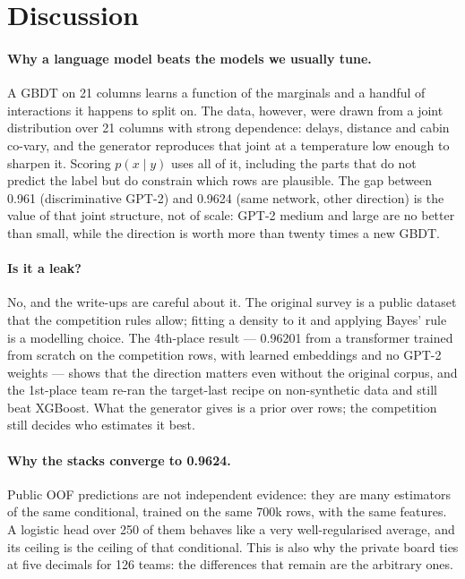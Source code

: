 \section{Discussion}
\label{sec:discussion}

\paragraph{Why a language model beats the models we usually tune.}
A GBDT on 21 columns learns a function of the marginals and a handful of interactions it
happens to split on. The data, however, were drawn from a joint distribution over 21
columns with strong dependence: delays, distance and cabin co-vary, and the generator
reproduces that joint at a temperature low enough to sharpen it. Scoring $p(x\mid y)$ uses
all of it, including the parts that do not predict the label but do constrain which rows
are plausible. The gap between 0.961 (discriminative GPT-2) and 0.9624 (same network, other
direction) is the value of that joint structure, not of scale: GPT-2 medium and large are
no better than small, while the direction is worth more than twenty times a new GBDT.

\paragraph{Is it a leak?}
No, and the write-ups are careful about it. The original survey is a public dataset that
the competition rules allow; fitting a density to it and applying Bayes' rule is a modelling
choice. The 4th-place result --- 0.96201 from a transformer trained from scratch on the
competition rows, with learned embeddings and no GPT-2 weights --- shows that the direction
matters even without the original corpus, and the 1st-place team re-ran the target-last
recipe on non-synthetic data and still beat XGBoost. What the generator gives is a prior
over rows; the competition still decides who estimates it best.

\paragraph{Why the stacks converge to 0.9624.}
Public OOF predictions are not independent evidence: they are many estimators of the same
conditional, trained on the same 700k rows, with the same features. A logistic head over
250 of them behaves like a very well-regularised average, and its ceiling is the ceiling of
that conditional. This is also why the private board ties at five decimals for 126 teams:
the differences that remain are the arbitrary ones.

